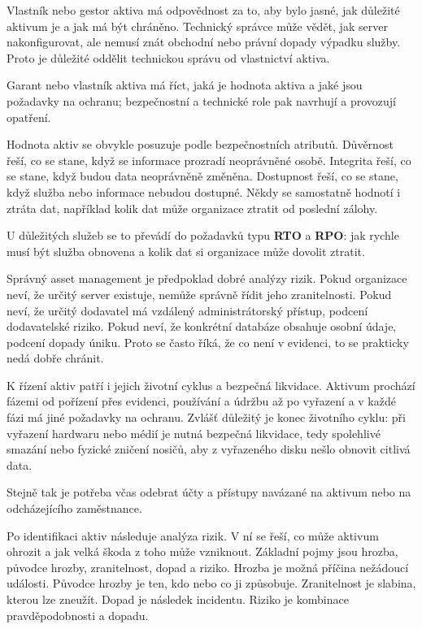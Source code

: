 \documentclass[11pt,a4paper]{article}
\begin{document}
Vlastník nebo gestor aktiva má odpovědnost za to, aby bylo jasné, jak důležité aktivum je a jak má být chráněno. Technický správce může vědět, jak server nakonfigurovat, ale nemusí znát obchodní nebo právní dopady výpadku služby. Proto je důležité oddělit technickou správu od vlastnictví aktiva.

Garant nebo vlastník aktiva má říct, jaká je hodnota aktiva a jaké jsou požadavky na ochranu; bezpečnostní a technické role pak navrhují a provozují opatření.

Hodnota aktiv se obvykle posuzuje podle bezpečnostních atributů. Důvěrnost řeší, co se stane, když se informace prozradí neoprávněné osobě. Integrita řeší, co se stane, když budou data neoprávněně změněna. Dostupnost řeší, co se stane, když služba nebo informace nebudou dostupné. Někdy se samostatně hodnotí i ztráta dat, například kolik dat může organizace ztratit od poslední zálohy.

U důležitých služeb se to převádí do požadavků typu \textbf{RTO} a \textbf{RPO}: jak rychle musí být služba obnovena a kolik dat si organizace může dovolit ztratit.

Správný asset management je předpoklad dobré analýzy rizik. Pokud organizace neví, že určitý server existuje, nemůže správně řídit jeho zranitelnosti. Pokud neví, že určitý dodavatel má vzdálený administrátorský přístup, podcení dodavatelské riziko. Pokud neví, že konkrétní databáze obsahuje osobní údaje, podcení dopady úniku. Proto se často říká, že co není v evidenci, to se prakticky nedá dobře chránit.

K řízení aktiv patří i jejich životní cyklus a bezpečná likvidace. Aktivum prochází fázemi od pořízení přes evidenci, používání a údržbu až po vyřazení a v každé fázi má jiné požadavky na ochranu. Zvlášť důležitý je konec životního cyklu: při vyřazení hardwaru nebo médií je nutná bezpečná likvidace, tedy spolehlivé smazání nebo fyzické zničení nosičů, aby z vyřazeného disku nešlo obnovit citlivá data.

Stejně tak je potřeba včas odebrat účty a přístupy navázané na aktivum nebo na odcházejícího zaměstnance.

Po identifikaci aktiv následuje analýza rizik. V ní se řeší, co může aktivum ohrozit a jak velká škoda z toho může vzniknout. Základní pojmy jsou hrozba, původce hrozby, zranitelnost, dopad a riziko. Hrozba je možná příčina nežádoucí události. Původce hrozby je ten, kdo nebo co ji způsobuje. Zranitelnost je slabina, kterou lze zneužít. Dopad je následek incidentu. Riziko je kombinace pravděpodobnosti a dopadu.
\end{document}
